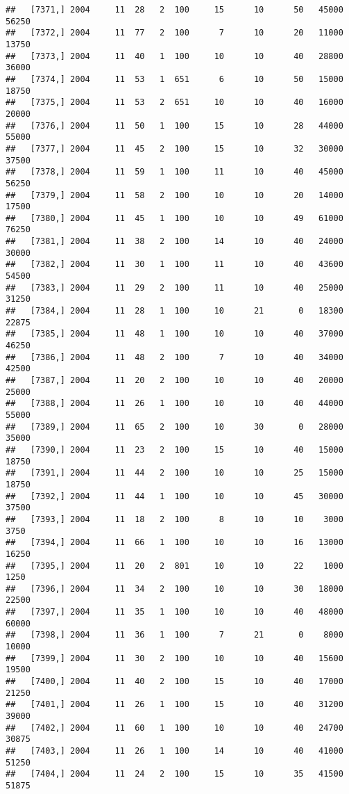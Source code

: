 \documentclass{article}\usepackage[]{graphicx}\usepackage[]{color}
\makeatletter
\newenvironment{kframe}{%
 \def\at@end@of@kframe{}%
 \ifinner\ifhmode%
  \def\at@end@of@kframe{\end{minipage}}%
  \begin{minipage}{\columnwidth}%
 \fi\fi%
 \def\FrameCommand##1{\hskip\@totalleftmargin \hskip-\fboxsep
 \colorbox{shadecolor}{##1}\hskip-\fboxsep
     \hskip-\linewidth \hskip-\@totalleftmargin \hskip\columnwidth}%
 \MakeFramed {\advance\hsize-\width
   \@totalleftmargin\z@ \linewidth\hsize
   \@setminipage}}%
 {\par\unskip\endMakeFramed%
 \at@end@of@kframe}
\newenvironment{knitrout}{}{} %
\makeatother
\begin{document}
\begin{knitrout}
\begin{kframe}
\begin{verbatim}
##   [7371,] 2004     11  28   2  100     15      10      50   45000   56250
##   [7372,] 2004     11  77   2  100      7      10      20   11000   13750
##   [7373,] 2004     11  40   1  100     10      10      40   28800   36000
##   [7374,] 2004     11  53   1  651      6      10      50   15000   18750
##   [7375,] 2004     11  53   2  651     10      10      40   16000   20000
##   [7376,] 2004     11  50   1  100     15      10      28   44000   55000
##   [7377,] 2004     11  45   2  100     15      10      32   30000   37500
##   [7378,] 2004     11  59   1  100     11      10      40   45000   56250
##   [7379,] 2004     11  58   2  100     10      10      20   14000   17500
##   [7380,] 2004     11  45   1  100     10      10      49   61000   76250
##   [7381,] 2004     11  38   2  100     14      10      40   24000   30000
##   [7382,] 2004     11  30   1  100     11      10      40   43600   54500
##   [7383,] 2004     11  29   2  100     11      10      40   25000   31250
##   [7384,] 2004     11  28   1  100     10      21       0   18300   22875
##   [7385,] 2004     11  48   1  100     10      10      40   37000   46250
##   [7386,] 2004     11  48   2  100      7      10      40   34000   42500
##   [7387,] 2004     11  20   2  100     10      10      40   20000   25000
##   [7388,] 2004     11  26   1  100     10      10      40   44000   55000
##   [7389,] 2004     11  65   2  100     10      30       0   28000   35000
##   [7390,] 2004     11  23   2  100     15      10      40   15000   18750
##   [7391,] 2004     11  44   2  100     10      10      25   15000   18750
##   [7392,] 2004     11  44   1  100     10      10      45   30000   37500
##   [7393,] 2004     11  18   2  100      8      10      10    3000    3750
##   [7394,] 2004     11  66   1  100     10      10      16   13000   16250
##   [7395,] 2004     11  20   2  801     10      10      22    1000    1250
##   [7396,] 2004     11  34   2  100     10      10      30   18000   22500
##   [7397,] 2004     11  35   1  100     10      10      40   48000   60000
##   [7398,] 2004     11  36   1  100      7      21       0    8000   10000
##   [7399,] 2004     11  30   2  100     10      10      40   15600   19500
##   [7400,] 2004     11  40   2  100     15      10      40   17000   21250
##   [7401,] 2004     11  26   1  100     15      10      40   31200   39000
##   [7402,] 2004     11  60   1  100     10      10      40   24700   30875
##   [7403,] 2004     11  26   1  100     14      10      40   41000   51250
##   [7404,] 2004     11  24   2  100     15      10      35   41500   51875

\end{verbatim}
\end{kframe}
\end{knitrout}
\end{document}
